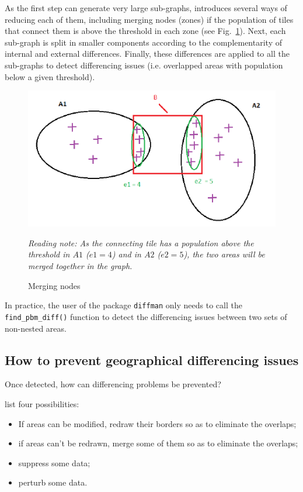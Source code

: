 As the first step can generate very large sub-graphs, \cite{Costemalle_2019} introduces several ways of reducing each of them, including merging nodes (zones) if the population of tiles that connect them is above the threshold in each zone (see Fig.~\ref{fig:merge_nodes}). Next, each sub-graph is split in smaller components according to the complementarity of internal and external differences. Finally, these differences are applied to all the sub-graphs to detect differencing issues (i.e. overlapped areas with population below a given threshold).


\begin{figure}[H]
\centering
\includegraphics[width=0.7\linewidth]{figures/Differencing_issues/merge_nodes.png}
\caption{Merging nodes}
\vspace{0.15 cm}
\textit{\footnotesize Reading note: As the connecting tile has a population above the threshold in $A1$ ($e1=4$) and in $A2$ ($e2=5$), the two areas will be merged together in the graph.}
\label{fig:merge_nodes}
\end{figure}

In practice, the user of the package \texttt{diffman} \citep{diffman} only needs to call the \texttt{find\_pbm\_diff()} function to detect the differencing issues between two sets of non-nested areas.

\subsection{How to prevent geographical differencing issues}

Once detected, how can differencing problems be prevented? 

\cite{BuronFontaine2018} list four possibilities:

\begin{itemize}
    \item If areas can be modified, redraw their borders so as to eliminate the overlaps;
    \item if areas can't be redrawn, merge some of them so as to eliminate the overlaps;
    \item suppress some data;
    \item perturb some data.
\end{itemize}

